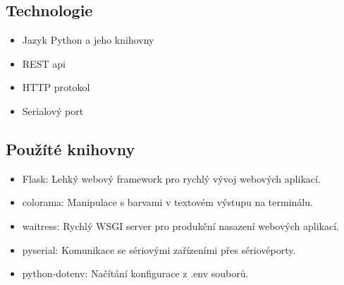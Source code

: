 \subsection*{Technologie}
\begin{itemize}
    \item Jazyk Python a jeho knihovny
    \item REST api
    \item HTTP protokol
    \item Serialový port
\end{itemize}

\subsection*{Použíté knihovny}
\begin{itemize}
    \item Flask: Lehký webový framework pro rychlý vývoj webových aplikací.
    \item colorama: Manipulace s barvami v textovém výstupu na terminálu.
    \item waitress: Rychlý WSGI server pro produkční nasazení webových aplikací.
    \item pyserial: Komunikace se sériovými zařízeními přes sériovéporty.
    \item python-dotenv: Načítání konfigurace z .env souborů.
\end{itemize}


%

%
